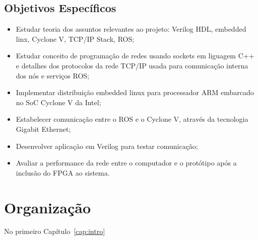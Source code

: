 \subsection{Objetivos Específicos}

\begin{itemize}
    \item Estudar teoria dos assuntos relevantes ao projeto: Verilog HDL, embedded linx,  Cyclone V, 
    TCP/IP Stack, ROS\@;
    \item Estudar conceito de programação de redes usando sockets em liguagem C++ e detalhes dos protocolos da rede TCP/IP usada para comunicação interna dos nós e serviços ROS\@;
    \item Implementar distribuição embedded linux para processador ARM embarcado no SoC Cyclone V da Intel;
    \item Estabelecer comunicação entre o ROS e o Cyclone V, através da tecnologia Gigabit Ethernet;
    \item Desenvolver aplicação em Verilog para testar comunicação;
    \item Avaliar a performance da rede entre o computador e o protótipo após a inclusão do FPGA ao sistema.
\end{itemize}


\section{Organização}

 No primeiro Capítulo~\ref{cap:intro}
